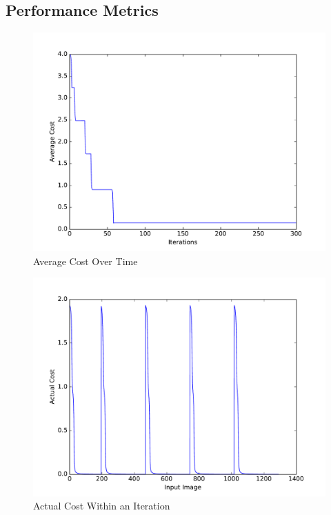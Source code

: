\subsection{Performance Metrics}




\begin{figure}
	\centering
	\includegraphics[width=\textwidth]{figures/multilayer_perceptron_average_cost}
	\caption{Average Cost Over Time}
	\label{fig:avg_cost}
	\centering
\end{figure}

\begin{figure}
	\centering
	\includegraphics[width=\textwidth]{figures/multilayer_perceptron_actual_cost}
	\caption{Actual Cost Within an Iteration}
	\label{fig:actual_cost}
	\centering
\end{figure}


